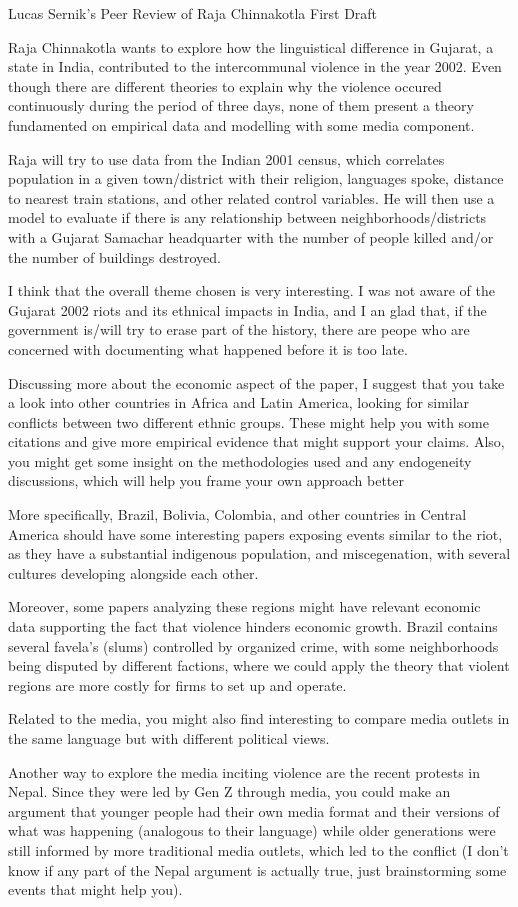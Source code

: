 \documentclass[12pt, a4paper]{article}
\author{Lucas Sernik}
\date{\today}
\begin{document}
{\large Lucas Sernik's Peer Review of Raja Chinnakotla First Draft}

\vspace{1cm}

\quad Raja Chinnakotla wants to explore how the linguistical difference in Gujarat, a state in India, contributed to the intercommunal violence in the year 2002. Even though there are different theories to explain why the violence occured continuously during the period of three days, none of them present a theory fundamented on empirical data and modelling with some media component.

\quad Raja will try to use data from the Indian 2001 census, which correlates population in a given town/district with their religion, languages spoke, distance to nearest train stations, and other related control variables. He will then use a model to evaluate if there is any relationship between neighborhoods/districts with a Gujarat Samachar headquarter with the number of people killed and/or the number of buildings destroyed.

\quad I think that the overall theme chosen is very interesting. I was not aware of the Gujarat 2002 riots and its ethnical impacts in India, and I an glad that, if the government is/will try to erase part of the history, there are peope who are concerned with documenting what happened before it is too late.

\quad Discussing more about the economic aspect of the paper, I suggest that you take a look into other countries in Africa and Latin America, looking for similar conflicts between two different ethnic groups. These might help you with some citations and give more empirical evidence that might support your claims. Also, you might get some insight on the methodologies used and any endogeneity discussions, which will help you frame your own approach better

\quad More specifically, Brazil, Bolivia, Colombia, and other countries in Central America should have some interesting papers exposing events similar to the riot, as they have a substantial indigenous population, and miscegenation, with several cultures developing alongside each other.

\quad Moreover, some papers analyzing these regions might have relevant economic data supporting the fact that violence hinders economic growth. Brazil contains several favela's (slums) controlled by organized crime, with some neighborhoods being disputed by different factions, where we could apply the theory that violent regions are more costly for firms to set up and operate.

\quad Related to the media, you might also find interesting to compare media outlets in the same language but with different political views.

\quad Another way to explore the media inciting violence are the recent protests in Nepal. Since they were led by Gen Z through media, you could make an argument that younger people had their own media format and their versions of what was happening (analogous to their language) while older generations were still informed by more traditional media outlets, which led to the conflict (I don't know if any part of the Nepal argument is actually true, just brainstorming some events that might help you).
\end{document}
